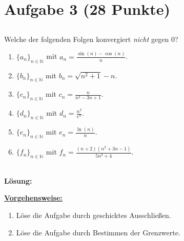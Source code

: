 \section*{Aufgabe 3 (28 Punkte)}
\vspace{0.4cm}
\subsection*{}
Welche der folgenden Folgen konvergiert \textit{nicht} gegen $0$?
\renewcommand{\labelenumi}{(\alph{enumi})}
\begin{enumerate}
	\item 
	$ \{a_n\}_{n \in \mathbb{N}} $ mit $a_n = \frac{\sin(n) - \cos(n)}{n}$.
	\item
	$ \{b_n\}_{n \in \mathbb{N}} $ mit $b_n = \sqrt{n^2 + 1 }  - n$.
	\item
	$ \{c_n\}_{n \in \mathbb{N}} $ mit $c_n = \frac{n}{n^2 - 3n +1 }$.
	\item
	$ \{d_n\}_{n \in \mathbb{N}} $ mit $d_n = \frac{n^2}{e^n}$.
	\item
	$ \{e_n\}_{n \in \mathbb{N}} $ mit $e_n = \frac{\ln(n)}{n}$.
	\item
	$ \{f_n\}_{n \in \mathbb{N}} $ mit $f_n = \frac{(n+2) (n^2 + 3n -1 )}{5n^3 + 4}$.
\end{enumerate}
\ \\
\textbf{Lösung:}
\begin{mdframed}
\underline{\textbf{Vorgehensweise:}}
\renewcommand{\labelenumi}{\theenumi.}
\begin{enumerate}
\item Löse die Aufgabe durch geschicktes Ausschließen.
\item Löse die Aufgabe durch Bestimmen der Grenzwerte.
\end{enumerate}
\end{mdframed}

